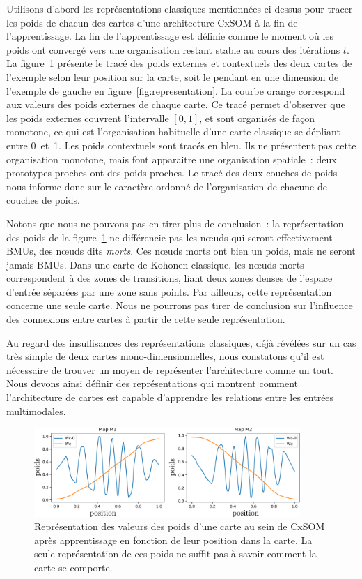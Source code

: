 \documentclass[../main]{subfiles}
\begin{document}
Utilisons d'abord les représentations classiques mentionnées ci-dessus pour tracer les poids de chacun des cartes d'une architecture CxSOM à la fin de l'apprentissage.
La fin de l'apprentissage est définie comme le moment où les poids ont convergé vers une organisation restant stable au cours des itérations $t$.
La figure~\ref{fig:weights} présente le tracé des poids externes et contextuels des deux cartes de l'exemple selon leur position sur la carte, soit le pendant en une dimension de l'exemple de gauche en figure~\ref{fig:representation}. 
La courbe orange correspond aux valeurs des poids externes de chaque carte.
Ce tracé permet d'observer que les poids externes couvrent l'intervalle $[0,1]$, et sont organisés de façon monotone, ce qui est l'organisation habituelle d'une carte classique se dépliant entre 0~et~1.
Les poids contextuels sont tracés en bleu. Ils ne présentent pas cette organisation monotone, mais font apparaitre une organisation spatiale~: deux prototypes proches ont des poids proches. 
Le tracé des deux couches de poids nous informe donc sur le caractère ordonné de l'organisation de chacune de couches de poids. 

Notons que nous ne pouvons pas en tirer plus de conclusion~: la représentation des poids de la figure~\ref{fig:weights} ne différencie pas les n\oe{}uds qui seront effectivement BMUs, des n\oe{}uds dits \emph{morts}.
Ces n\oe{}uds morts ont bien un poids, mais ne seront jamais BMUs.
Dans une carte de Kohonen classique, les n\oe{}uds morts correspondent à des zones de transitions, liant deux zones denses de l'espace d'entrée séparées par une zone sans points.
Par ailleurs, cette représentation concerne une seule carte. Nous ne pourrons pas tirer de conclusion sur l'influence des connexions entre cartes à partir de cette seule représentation.

Au regard des insuffisances des représentations classiques, déjà révélées sur un cas très simple de deux cartes mono-dimensionnelles, nous constatons qu'il est nécessaire de trouver un moyen de représenter l'architecture comme un tout. Nous devons ainsi définir des représentations qui montrent comment l'architecture de cartes est capable d'apprendre les relations entre les entrées multimodales.

\begin{figure}
\centering
\includegraphics[width=0.9\textwidth]{weights_cercle1.pdf}

\caption{Représentation des valeurs des poids d'une carte au sein de CxSOM après apprentissage en fonction de leur position dans la carte. La seule représentation de ces poids ne suffit pas à savoir comment la carte se comporte.\label{fig:weights}}
\end{figure}
\end{document}
